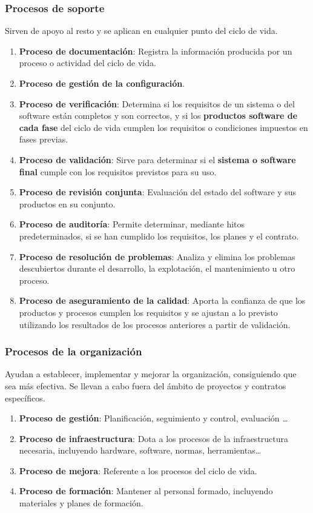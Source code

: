 \subsubsection{Procesos de soporte}
Sirven de apoyo al resto y se aplican en cualquier punto del ciclo de vida.
\begin{enumerate}
    \item \textbf{Proceso de documentación}: Registra la información producida por un proceso o actividad del ciclo de vida.
    \item \textbf{Proceso de gestión de la configuración}.
    \item \textbf{Proceso de verificación}: Determina si los requisitos de un sistema o del software están completos y son correctos, y si los \textbf{productos software de cada fase} del ciclo de vida cumplen los requisitos o condiciones impuestos en fases previas.
    \item \textbf{Proceso de validación}: Sirve para determinar si el \textbf{sistema o software final} cumple con los requisitos previstos para su uso.
    \item \textbf{Proceso de revisión conjunta}: Evaluación del estado del software y sus productos en su conjunto.
    \item \textbf{Proceso de auditoría}: Permite determinar, mediante hitos predeterminados, si se han cumplido los requisitos, los planes y el contrato.
    \item \textbf{Proceso de resolución de problemas}: Analiza y elimina los problemas descubiertos durante el desarrollo, la explotación, el mantenimiento u otro proceso.
    \item \textbf{Proceso de aseguramiento de la calidad}: Aporta la confianza de que los productos y procesos cumplen los requisitos y se ajustan a lo previsto utilizando los resultados de los procesos anteriores a partir de validación.
\end{enumerate}

\subsubsection{Procesos de la organización}
Ayudan a establecer, implementar y mejorar la organización, consiguiendo que sea más efectiva. Se llevan a cabo fuera del ámbito de proyectos y contratos específicos.

\begin{enumerate}
    \item \textbf{Proceso de gestión}: Planificación, seguimiento y control, evaluación \ldots
    \item \textbf{Proceso de infraestructura}: Dota a los procesos de la infraestructura necesaria, incluyendo hardware, software, normas, herramientas\ldots
    \item \textbf{Proceso de mejora}: Referente a los procesos del ciclo de vida.
    \item \textbf{Proceso de formación}: Mantener al personal formado, incluyendo materiales y planes de formación.
\end{enumerate}

